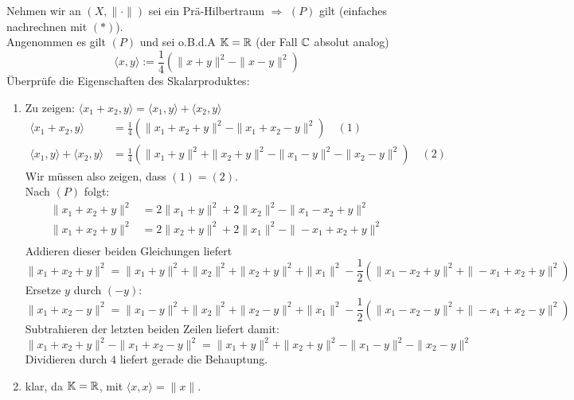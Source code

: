 \begin{beweis}
	Nehmen wir an $(X, \| \cdot \|)$ sei ein Prä-Hilbertraum $\Rightarrow$ \hyperref[eq:15.6-rallelogrammGleichung]{$(P)$} gilt (einfaches nachrechnen mit \hyperref[eq:15.2-*]{$(*)$}). \\
	Angenommen es gilt \hyperref[eq:15.6-rallelogrammGleichung]{$(P)$} und sei o.B.d.A $\mathbb{K} = \mathbb{R}$ (der Fall $\mathbb{C}$ absolut analog) 
	\[  \langle x, y \rangle := \frac{1}{4} \left( \| x + y \|^{2} - \| x - y \|^{2} \right) \]
	Überprüfe die Eigenschaften des Skalarproduktes:
	\begin{enumerate}[label=\roman*\upshape)]
		\item Zu zeigen: $\langle x_{1} + x_{2}, y \rangle = \langle x_{1}, y \rangle + \langle x_{2}, y \rangle$
			\begin{align*}
				\langle x_{1} + x_{2}, y \rangle & = \frac{1}{4} \left( \| x_{1} + x_{2} + y \|^{2} - \| x_{1} + x_{2} - y \|^{2} \right) \quad (1) \\
				\langle x_{1}, y \rangle + \langle x_{2}, y \rangle & = \frac{1}{4} \left( \| x_{1} + y \|^{2} + \| x_{2} + y \|^{2} - \| x_{1} - y \|^{2} - \| x_{2} - y \|^{2} \right) \quad (2)
			\end{align*}
			Wir müssen also zeigen, dass $(1) = (2)$. \\
			Nach \hyperref[eq:15.6-rallelogrammGleichung]{$(P)$} folgt:
			\begin{align*}
				\| x_{1} + x_{2} + y \|^{2} & = 2 \| x_{1} + y \|^{2} + 2 \| x_{2} \|^{2} - \| x_{1} - x_{2} + y \|^{2} \\
				\| x_{1} + x_{2} + y \|^{2} & = 2 \| x_{2} + y \|^{2} + 2 \| x_{1} \|^{2} - \| - x_{1} + x_{2} + y \|^{2} \\
			\end{align*}
			Addieren dieser beiden Gleichungen liefert
			\[ \| x_{1} + x_{2} + y \|^{2} =  \| x_{1} + y \|^{2} + \| x_{2} \|^{2} + \| x_{2} + y \|^{2} +  \| x_{1} \|^{2} - \frac{1}{2} \left( \| x_{1} - x_{2} + y \|^{2} + \| - x_{1} + x_{2} + y \|^{2} \right) \]
			Ersetze $y$ durch $(-y)$:
			\[ \| x_{1} + x_{2} - y \|^{2} =  \| x_{1} - y \|^{2} + \| x_{2} \|^{2} + \| x_{2} - y \|^{2} +  \| x_{1} \|^{2} - \frac{1}{2} \left( \| x_{1} - x_{2} - y \|^{2} + \| - x_{1} + x_{2} - y \|^{2} \right) \]
			Subtrahieren der letzten beiden Zeilen liefert damit:
			\[ \| x_{1} + x_{2} + y \|^{2} - \| x_{1} + x_{2} - y \|^{2} = \| x_{1} + y \|^{2} + \| x_{2} + y \|^{2} - \| x_{1} - y \|^{2} - \| x_{2} - y \| ^{2} \]
			Dividieren durch $4$ liefert gerade die Behauptung.
		\item klar, da $\mathbb{K} = \mathbb{R}$, mit $\langle x, x \rangle = \| x \|$.

\end{enumerate}
\end{beweis}
